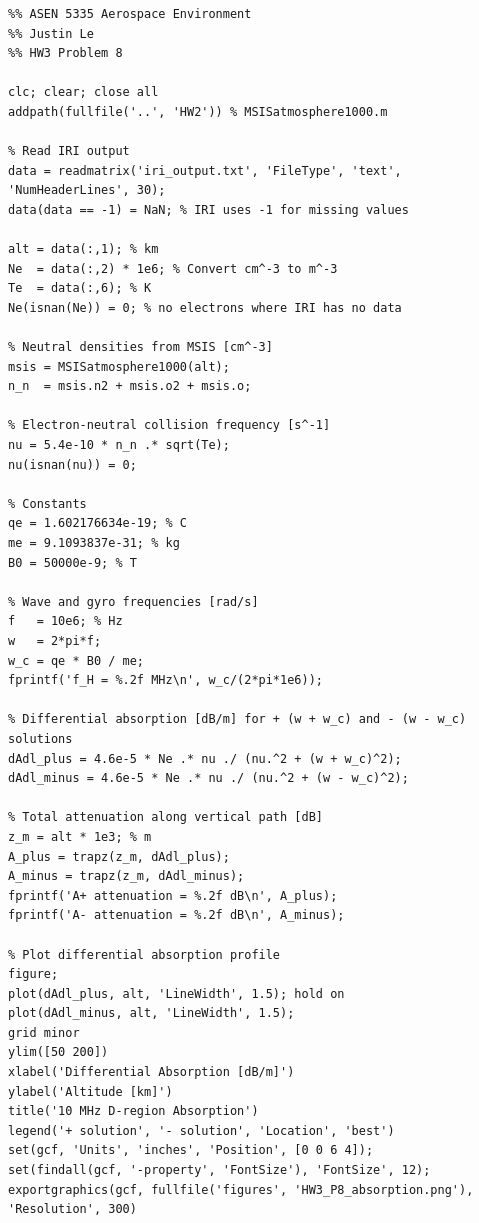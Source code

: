 \documentclass[11pt]{article}
\begin{document}
\newpage
\begin{lstlisting}
%% ASEN 5335 Aerospace Environment
%% Justin Le
%% HW3 Problem 8

clc; clear; close all
addpath(fullfile('..', 'HW2')) % MSISatmosphere1000.m

% Read IRI output
data = readmatrix('iri_output.txt', 'FileType', 'text', 'NumHeaderLines', 30);
data(data == -1) = NaN; % IRI uses -1 for missing values

alt = data(:,1); % km
Ne  = data(:,2) * 1e6; % Convert cm^-3 to m^-3
Te  = data(:,6); % K
Ne(isnan(Ne)) = 0; % no electrons where IRI has no data

% Neutral densities from MSIS [cm^-3]
msis = MSISatmosphere1000(alt);
n_n  = msis.n2 + msis.o2 + msis.o;

% Electron-neutral collision frequency [s^-1]
nu = 5.4e-10 * n_n .* sqrt(Te);
nu(isnan(nu)) = 0;

% Constants
qe = 1.602176634e-19; % C
me = 9.1093837e-31; % kg
B0 = 50000e-9; % T

% Wave and gyro frequencies [rad/s]
f   = 10e6; % Hz
w   = 2*pi*f;
w_c = qe * B0 / me;
fprintf('f_H = %.2f MHz\n', w_c/(2*pi*1e6));

% Differential absorption [dB/m] for + (w + w_c) and - (w - w_c) solutions
dAdl_plus = 4.6e-5 * Ne .* nu ./ (nu.^2 + (w + w_c)^2);
dAdl_minus = 4.6e-5 * Ne .* nu ./ (nu.^2 + (w - w_c)^2);

% Total attenuation along vertical path [dB]
z_m = alt * 1e3; % m
A_plus = trapz(z_m, dAdl_plus);
A_minus = trapz(z_m, dAdl_minus);
fprintf('A+ attenuation = %.2f dB\n', A_plus);
fprintf('A- attenuation = %.2f dB\n', A_minus);

% Plot differential absorption profile
figure;
plot(dAdl_plus, alt, 'LineWidth', 1.5); hold on
plot(dAdl_minus, alt, 'LineWidth', 1.5);
grid minor
ylim([50 200])
xlabel('Differential Absorption [dB/m]')
ylabel('Altitude [km]')
title('10 MHz D-region Absorption')
legend('+ solution', '- solution', 'Location', 'best')
set(gcf, 'Units', 'inches', 'Position', [0 0 6 4]);
set(findall(gcf, '-property', 'FontSize'), 'FontSize', 12);
exportgraphics(gcf, fullfile('figures', 'HW3_P8_absorption.png'), 'Resolution', 300)
\end{lstlisting}
\end{document}
